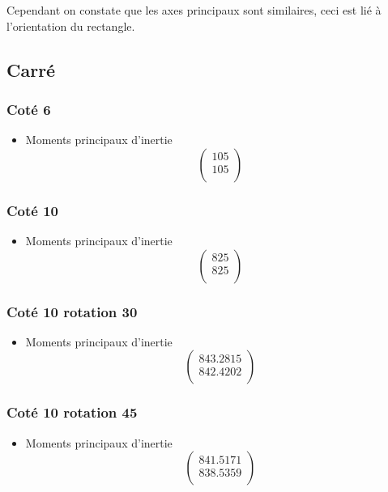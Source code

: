 \documentclass[a4paper,12pt]{report}
\begin{document}
Cependant on constate que les axes principaux sont similaires, ceci est lié à l'orientation du rectangle.

\subsection*{Carré}

\subsubsection*{Coté 6}
\begin{itemize}
\item Moments principaux d'inertie
\[
   \left (
   \begin{array}{c}
      105 \\
      105 \\
   \end{array}
   \right )
\]
\end{itemize}

\subsubsection*{Coté 10}
\begin{itemize}
\item Moments principaux d'inertie
\[
   \left (
   \begin{array}{c}
      825 \\
      825 \\
   \end{array}
   \right )
\]
\end{itemize}

\subsubsection*{Coté 10 rotation 30}
\begin{itemize}
\item Moments principaux d'inertie
\[
   \left (
   \begin{array}{c}
      843.2815 \\
      842.4202 \\
   \end{array}
   \right )
\]
\end{itemize}

\subsubsection*{Coté 10 rotation 45}
\begin{itemize}
\item Moments principaux d'inertie
\[
   \left (
   \begin{array}{c}
      841.5171 \\
      838.5359 \\
   \end{array}
   \right )
\]
\end{itemize}
\end{document}
